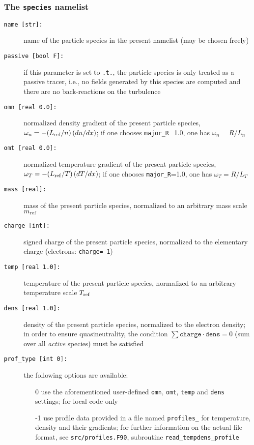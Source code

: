 \documentclass[12pt]{article}
\begin{document}
\subsubsection{{The \texttt{species} namelist}}
\hypertarget{species_nml}{}
\begin{description}
\item[\texttt{name [str]:}] name of the particle species in the present namelist (may be chosen freely)
\item[\texttt{passive [bool F]:}] if this parameter is set to \texttt{.t.}, the particle species is
only treated as a passive tracer, i.e., no fields generated by this species are computed and
there are no back-reactions on the turbulence
\item[\texttt{omn [real 0.0]:}] normalized density gradient of the present particle species,
  $\omega_n=-(L_{\rm ref}/n)\,(dn/dx)$; if one chooses \texttt{major\_R}=1.0, one has $\omega_n=R/L_n$
\item[\texttt{omt [real 0.0]:}] normalized temperature gradient of the present particle species,
  $\omega_T=-(L_{\rm ref}/T)\,(dT/dx)$; if one chooses \texttt{major\_R}=1.0, one has $\omega_T=R/L_T$
\item[\texttt{mass [real]:}] mass of the present particle species, normalized to an arbitrary mass scale $m_{\rm ref}$
\item[\texttt{charge [int]:}] signed charge of the present particle species, normalized to the elementary charge
  (electrons: \texttt{charge=-1})
\item[\texttt{temp [real 1.0]:}] temperature of the present particle species, normalized to an arbitrary temperature
scale $T_{\rm ref}$
\item[\texttt{dens [real 1.0]:}] density of the present particle species, normalized to the electron density;
in order to ensure quasineutrality, the condition $\sum \texttt{charge}\cdot\texttt{dens}=0$ (sum over all
{\em active} species) must be satisfied
\item[\hypertarget{prof_type}{\tt prof\_type [int 0]:}] the following options are available:
\begin{itemize}
 \item[0] use the aforementioned user-defined \texttt{omn}, \texttt{omt}, \texttt{temp} and \texttt{dens} settings; for local code only
 \item[-1] use profile data provided in a file named \texttt{profiles\_<species name>}
  for temperature, density and their gradients; for further information on the actual file format,
  see \texttt{src/profiles.F90}, subroutine \texttt{read\_tempdens\_profile}

\end{itemize}
\end{description}
\end{document}
